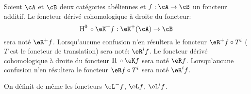 Soient $\cA$ et $\cB$ deux cat\'egories ab\'eliennes et $f:\cA\to \cB$ un 
foncteur additif. Le foncteur d\'eriv\'e cohomologique \`a droite du foncteur: 
\[
  \h^0{}\circ \eK^+ f:\eK^+(\cA) \to \cB 
\]
sera not\'e $\eR^+ f$. Lorsqu'aucune confusion n'en r\'esultera le foncteur 
$\eR^+ f\circ T^i$ ($T$ est le foncteur de translation) sera not\'e: 
$\eR^i f$. Le foncteur d\'eriv\'e cohomologique \`a droite du foncteur 
$\h{}\circ \eK f$ sera not\'e $\eR f$. Lorsqu'aucune confusion n'en r\'esultera 
le foncteur $\eR f\circ T^i$ sera not\'e $\eR^i f$. 

On d\'efinit de m\^eme les foncteurs $\eL^- f$, $\eL f$, $\eL^i f$. 















